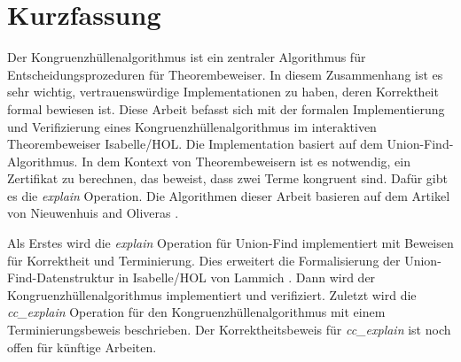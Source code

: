\chapter{Kurzfassung}

Der Kongruenzhüllenalgorithmus ist ein zentraler Algorithmus für Entscheidungsprozeduren für Theorembeweiser. In diesem Zusammenhang ist es sehr wichtig, vertrauenswürdige Implementationen zu haben, deren Korrektheit formal bewiesen ist. Diese Arbeit befasst sich mit der formalen Implementierung und Verifizierung eines Kongruenzhüllenalgorithmus im interaktiven Theorembeweiser Isabelle/HOL. Die Implementation basiert auf dem Union-Find-Algorithmus. In dem Kontext von Theorembeweisern ist es notwendig, ein Zertifikat zu berechnen, das beweist, dass zwei Terme kongruent sind. Dafür gibt es die \emph{explain} Operation. Die Algorithmen dieser Arbeit basieren auf dem Artikel von Nieuwenhuis and Oliveras \cite{Nieuwenhuis}.

Als Erstes wird die \emph{explain} Operation für Union-Find implementiert mit Beweisen für Korrektheit und Terminierung. Dies erweitert die Formalisierung der Union-Find-Datenstruktur in Isabelle/HOL von Lammich \cite{unionfind-isabelle}. Dann wird der Kongruenzhüllenalgorithmus implementiert und verifiziert. Zuletzt wird die \emph{cc\_explain} Operation für den Kongruenzhüllenalgorithmus mit einem Terminierungsbeweis beschrieben. Der Korrektheitsbeweis für \emph{cc\_explain} ist noch offen für künftige Arbeiten.